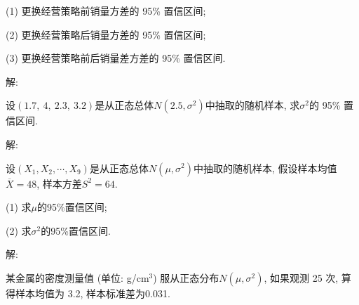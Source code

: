 \documentclass[standard]{ExBook}
\begin{document}
\begin{qitems}
\begin{bbox}
\begin{shaded}
(1) 更换经营策略前销量方差的 95\% 置信区间;

(2) 更换经营策略后销量方差的 95\% 置信区间;

(3) 更换经营策略前后销量差方差的 95\% 置信区间.
    \end{shaded}
    \end{bbox}

\vspace{-5em}

    \begin{bbox}
解: 
    \end{bbox}

\vspace{-5em}

    \begin{bbox}
    \begin{shaded}
        \qitem
设$(1.7,\ 4,\ 2.3,\ 3.2)$是从正态总体$N(2.5,\sigma^2)$中抽取的随机样本, 求$\sigma^2$的 95\% 置信区间.
    \end{shaded}
    \end{bbox}

\vspace{-5em}

    \begin{bbox}
解: 
    \end{bbox}

\vspace{-5em}

    \begin{bbox}
    \begin{shaded}
        \qitem
设$(X_1,X_2,\cdots,X_9)$是从正态总体$N(\mu,\sigma^2)$中抽取的随机样本, 假设样本均值$\overline{X}=48$, 样本方差$S^2=64$.

(1) 求$\mu$的95\%置信区间;

(2) 求$\sigma^2$的95\%置信区间.
    \end{shaded}
    \end{bbox}

\vspace{-5em}

    \begin{bbox}
解: 
    \end{bbox}

\vspace{-5em}

    \begin{bbox}
    \begin{shaded}
        \qitem
某金属的密度测量值 (单位: g/cm$^3$) 服从正态分布$N(\mu,\sigma^2)$, 如果观测 25 次, 算得样本均值为 3.2, 样本标准差为0.031.


\end{shaded}
\end{bbox}
\end{qitems}
\end{document}
